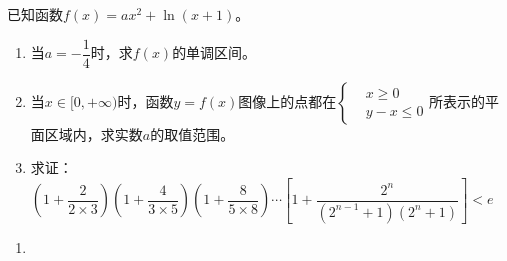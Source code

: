 \begin{que}
	已知函数$f(x)=ax^2+\ln(x+1)$。\begin{enumerate}
		\item 当$a=-\dfrac{1}{4}$时，求$f(x)$的单调区间。
		\item 当$x\in[0,+\infty)$时，函数$y=f(x)$图像上的点都在$\left\{\begin{aligned}
			&x\geqslant 0\\&y-x\leqslant 0
		\end{aligned}\right.$所表示的平面区域内，求实数$a$的取值范围。
		\item 求证：$\left(1+\dfrac{2}{2\times3}\right)\left(1+\dfrac{4}{3\times5}\right)\left(1+\dfrac{8}{5\times8}\right)\cdots\left[1+\dfrac{2^n}{(2^{n-1}+1)(2^n+1)}\right]<e$
	\end{enumerate}
\end{que}
\sol \begin{enumerate}
	\item 
\end{enumerate}

